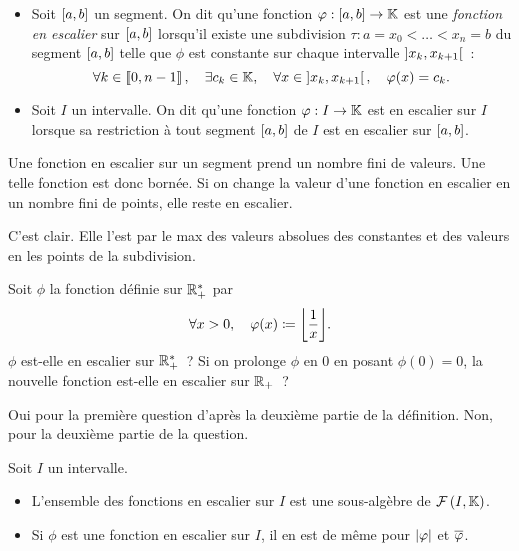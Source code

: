 \documentclass{magnolia}
\begin{document}
\begin{definition}[utile=-3]
$\quad$
\begin{itemize}
\item Soit $\left[a,b\right]$ un segment. On dit qu'une fonction
  $\varphi : \left[a,b\right]\to\mathbb{K}$ est une \emph{fonction en escalier} sur
  $\left[a,b\right]$ lorsqu'il existe une subdivision
  \mbox{$\tau : a=x_0<\dots<x_n=b$}
  du segment $\left[a,b\right]$ telle que $\phi$ est constante sur chaque
  intervalle $\left]x_k,x_{k+1}\right[$~:
  \[\forall k\in\left\llbracket 0,n-1\right\rrbracket ,\quad \exists c_k\in\mathbb{K} ,\quad
    \forall x\in\left]x_k,x_{k+1}\right[ ,\quad \varphi(x)=c_k.\]
\item Soit $I$ un intervalle. On dit qu'une fonction $\varphi : I\to\mathbb{K}$ est en
  escalier sur $I$ lorsque sa restriction à tout segment $\left[a,b\right]$ de $I$
  est en escalier sur $\left[a,b\right]$.
\end{itemize}
\end{definition}

\begin{remarqueUnique}
\remarque Une fonction en escalier sur un segment prend un nombre fini de valeurs.
  Une telle fonction est donc bornée.
\remarque[utile=-2] Si on change la valeur d'une fonction en escalier en un nombre fini
  de points, elle reste en escalier.
\end{remarqueUnique}

\begin{preuve}
C'est clair. Elle l'est par le max des valeurs absolues des constantes et des valeurs en les points de la subdivision.
\end{preuve}

\begin{exoUnique}
  \exo[utile=1] Soit $\phi$ la fonction définie sur $\mathbb{R}_+^*$ par
    \[\forall x>0 \qsep \phi(x)\defeq\ent{\frac{1}{x}}.\]
    $\phi$ est-elle en escalier sur $\mathbb{R}_+^*$~? Si on prolonge $\phi$ en $0$ en posant $\phi(0)=0$, la nouvelle fonction est-elle en escalier sur $\mathbb{R}_+$~?
    \begin{sol}
    Oui pour la première question d'après la deuxième partie de la définition. Non, pour la deuxième partie de la question.
    \end{sol}
\end{exoUnique}
  

\begin{proposition}[utile=-3]
Soit $I$ un intervalle.
\begin{itemize}
\item L'ensemble des fonctions en escalier sur $I$ est une
  sous-algèbre de $\mathcal{F}\left(I,\mathbb{K}\right)$.
\item Si $\phi$ est une fonction en escalier sur $I$, il en est de même pour $\left|\varphi\right|$ et $\overline{\varphi}$.
\end{itemize}
\end{proposition}
\end{document}
